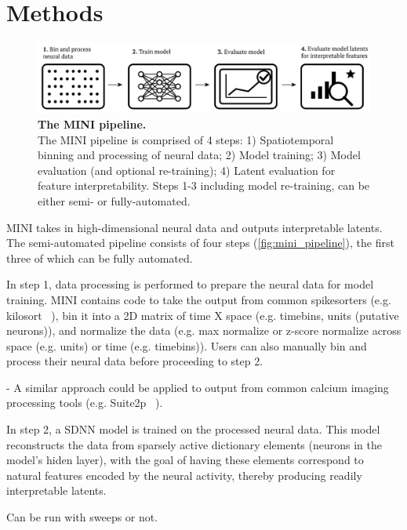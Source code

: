 \section{Methods}

\begin{figure}[h]
    \centering
    \includegraphics[width=\linewidth]{figures/mini_pipeline.pdf}
    \caption{
        \textbf{The MINI pipeline.} \\
        \small The MINI pipeline is comprised of 4 steps: 1) Spatiotemporal binning and processing of neural data; 2) Model training; 3) Model evaluation (and optional re-training); 4) Latent evaluation for feature interpretability. Steps 1-3 including model re-training, can be either semi- or fully-automated.
    }
    \label{fig:mini_pipeline}
\end{figure}

MINI takes in high-dimensional neural data and outputs interpretable latents. The semi-automated pipeline consists of four steps (\autoref{fig:mini_pipeline}), the first three of which can be fully automated.

In step 1, data processing is performed to prepare the neural data for model training. MINI contains code to take the output from common spikesorters (e.g. kilosort ~\cite{pachitariu_2016_kilosort}), bin it into a 2D matrix of time X space (e.g. timebins, units (putative neurons)), and normalize the data (e.g. max normalize or z-score normalize across space (e.g. units) or time (e.g. timebins)). Users can also manually bin and process their neural data before proceeding to step 2.

- A similar approach could be applied to output from common calcium imaging processing tools (e.g. Suite2p ~\cite{pachitariu_2017_suite2p}).

In step 2, a SDNN model is trained on the processed neural data. This model reconstructs the data from sparsely active dictionary elements (neurons in the model's hiden layer), with the goal of having these elements correspond to natural features encoded by the neural activity, thereby producing readily interpretable latents.

Can be run with sweeps or not. 


